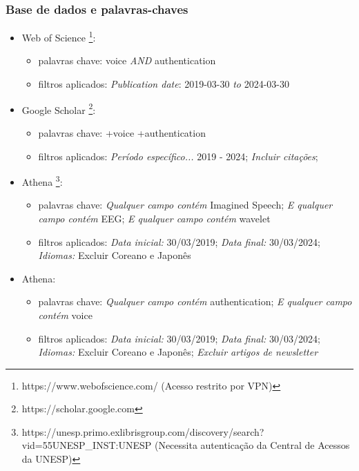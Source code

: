 			\subsubsection{Base de dados e palavras-chaves}
			\label{sec:baseEPalavras}
			\begin{itemize}
				\item Web of Science \footnote{https://www.webofscience.com/ (Acesso restrito por VPN)}:
				\begin{itemize}
					\item palavras chave: voice \textit{AND} authentication
					\item filtros aplicados: \textit{Publication date}: 2019-03-30 \textit{to} 2024-03-30
				\end{itemize}
				
				\item Google Scholar \footnote{https://scholar.google.com}:
				\begin{itemize}
					\item palavras chave: +voice +authentication
					\item filtros aplicados: \textit{Período específico...} 2019 - 2024; \textit{Incluir citações};
				\end{itemize}
				\item Athena \footnote{https://unesp.primo.exlibrisgroup.com/discovery/search?vid=55UNESP\_INST:UNESP (Necessita autenticação da Central de Acessos da UNESP)}:
				\begin{itemize}
					\item palavras chave: \textit{Qualquer campo contém} Imagined Speech; \textit{E qualquer campo contém} EEG; \textit{E qualquer campo contém} wavelet
					\item filtros aplicados: \textit{Data inicial:} 30/03/2019; \textit{Data final:} 30/03/2024; \textit{Idiomas:} Excluir Coreano e Japonês
				\end{itemize}
				\item Athena:
				\begin{itemize}
					\item palavras chave: \textit{Qualquer campo contém} authentication; \textit{E qualquer campo contém} voice
					\item filtros aplicados: \textit{Data inicial:} 30/03/2019; \textit{Data final:} 30/03/2024; \textit{Idiomas:} Excluir Coreano e Japonês; \textit{Excluir artigos de newsletter}
				\end{itemize}
			\end{itemize}
		
